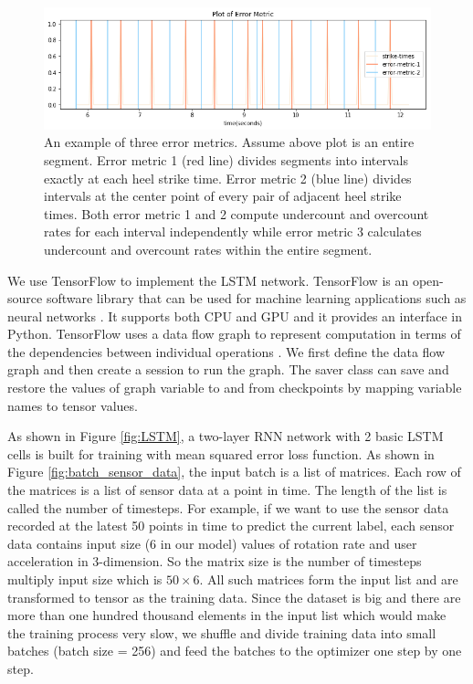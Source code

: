 \documentclass[11pt]{article}
\begin{document}
\begin{figure}[ht]
\centering
\includegraphics[scale=0.6]{error_metric}
\caption{An example of three error metrics. Assume above plot is an entire segment. Error metric 1 (red line) divides segments into intervals exactly at each heel strike time. Error metric 2 (blue line) divides intervals at the center point of every pair of adjacent heel strike times. Both error metric 1 and 2 compute undercount and overcount rates for each interval independently while error metric 3 calculates undercount and overcount rates within the entire segment.}
\label{fig:error_metric}
\end{figure}

We use TensorFlow to implement the LSTM network. TensorFlow is an open-source software library that can be used for machine learning applications such as neural networks \citep{wiki:tensorflow}. It supports both CPU and GPU and it provides an interface in Python. TensorFlow uses a data flow graph to represent computation in terms of the dependencies between individual operations \citep{tensorflow.org}. We first define the data flow graph and then create a session to run the graph. The saver class can save and restore the values of graph variable to and from checkpoints by mapping variable names to tensor values.

As shown in Figure \ref{fig:LSTM}, a two-layer RNN network with 2 basic LSTM cells is built for training with mean squared error loss function. 
As shown in Figure \ref{fig:batch_sensor_data}, the input batch is a list of matrices. Each row of the matrices is a list of sensor data at a point in time. The length of the list is called the number of timesteps.
For example, if we want to use the sensor data recorded at the latest 50 points in time to predict the current label, each sensor data contains input size ($6$ in our model) values of rotation rate and user acceleration in 3-dimension. So the matrix size is the number of timesteps multiply input size which is $50 \times 6$. All such matrices form the input list and are transformed to tensor as the training data. Since the dataset is big and there are more than one hundred thousand elements in the input list which would make the training process very slow, we shuffle and divide training data into small batches (batch size = 256) and feed the batches to the optimizer one step by one step.
\end{document}
